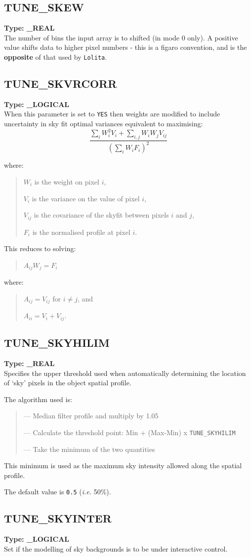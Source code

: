 \documentclass[11pt,twoside]{article}
\makeatletter
\newcommand{\xref}[3]{#1}
\newcommand{\xlabel}[1]{}
\newcommand{\sunspec}[2]{#1}
\renewcommand{\sunspec}[2]{#2}
\newcommand{\indexcmdname}[1]{\index{#1@\protect\cmdname{#1}}}
\renewcommand{\indexcmdname}[1]{}
\newcommand{\cmdname}{\begingroup \catcode`\_=12 \realcmdname}
\newcommand{\realcmdname}[1]{\endgroup\texttt{#1}}
\newcommand{\echparameter}[4]
{
\item [#1 = #3] \mbox{}\label{par_#2}\indexcmdname{#2}
\\
#4
}
\renewcommand{\echparameter}[4]
{
  \subsection{\xlabel{par_#2}\label{par_#2}{\bf #1}}
  {\bf Type: #3}\\
#4
}
\makeatother
\begin{document}
\echparameter{TUNE\_SKEW}{TUNE_SKEW}{
 \_REAL
}{
 The number of bins the input array is to shifted (in mode 0 only).
 A positive value shifts data to higher pixel numbers - this is a
 \xref{{\sc figaro}}{sun86}{} convention, and is the {\bf opposite} of that
 used by {\tt Lolita}.
}

\echparameter{TUNE\_SKVRCORR}{TUNE_SKVRCORR}{
 \_LOGICAL
}{
 When this parameter is set to \texttt{YES} then weights are modified to
 include uncertainty in sky fit optimal variances equivalent to
 maximising:
 \[ \frac{\sum_{i} W_{i}^{2}V_{i} + \sum_{i,j} W_{i}W_{j}V_{ij}}
         {(\sum_{i} W_{i}F_{i})^{2}} \]

 where:
 \begin{quote}
    $W_{i}$ is the weight on pixel $i$,

    $V_{i}$ is the variance on the value of pixel $i$,

    $V_{ij}$ is the covariance of the skyfit between pixels $i$ and $j$,

    $F_{i}$ is the normalised profile at pixel $i$.
 \end{quote}
 This reduces to solving:
 \begin{quote}
     $A_{ij}W_{j} = F_{i}$
 \end{quote}
 where:
 \begin{quote}
    $A_{ij} = V_{ij}$ for $i \neq j$, and

    $A_{ii} = V_{i} + V_{ij}$.
 \end{quote}
}

\echparameter{TUNE\_SKYHILIM}{TUNE_SKYHILIM}{
 \_REAL
}{
 Specifies the upper threshold used when automatically determining
 the location of `sky' pixels in the object spatial profile.

 The algorithm used is:

 \begin{quote}
    --- Median filter profile and multiply by 1.05

    --- Calculate the threshold point:
        Min + (Max\sunspec{$-$}{-}Min) \sunspec{$\times$}{x} {\tt TUNE\_SKYHILIM}

    --- Take the minimum of the two quantities
 \end{quote}

 This minimum is used as the maximum sky intensity allowed along
 the spatial profile.

 The default value is \texttt{0.5} ({\it{i.e.}} 50\%).
}

\echparameter{TUNE\_SKYINTER}{TUNE_SKYINTER}{
 \_LOGICAL
}{
 Set if the modelling of sky backgrounds is to be under
 interactive control.
}
\end{document}
